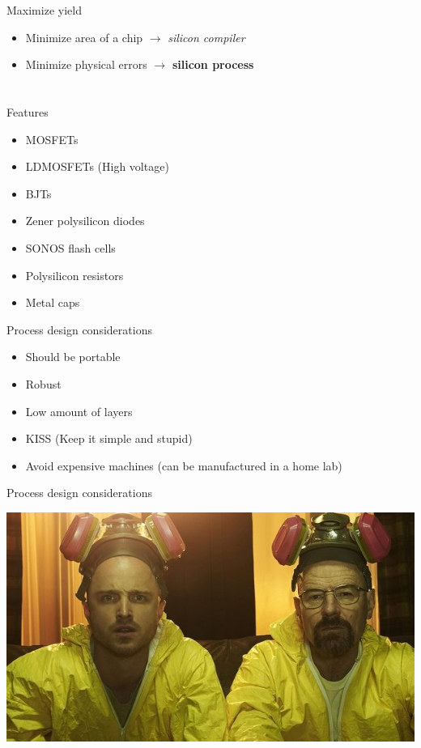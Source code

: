 \documentclass[aspectratio=169]{beamer}
\begin{document}
\begin{frame}{Maximize yield}
	\begin{itemize}
        \setlength\itemsep{1em}
		\item Minimize area of a chip $\rightarrow$ \textit{silicon compiler}
		\item Minimize physical errors $\rightarrow$ \textbf{silicon process}
	\end{itemize}
\end{frame}


\section[Process]{}

\begin{frame}{Features}
	\begin{itemize}
        \setlength\itemsep{1em}
		\item MOSFETs
		\item LDMOSFETs (High voltage) 
		\item BJTs
		\item Zener polysilicon diodes
		\item SONOS flash cells
		\item Polysilicon resistors
		\item Metal caps
	\end{itemize}
\end{frame}

\begin{frame}{Process design considerations}
	\begin{itemize}
		\item Should be portable
		\item Robust
		\item Low amount of layers
		\item KISS (Keep it simple and stupid)
		\item Avoid expensive machines (can be manufactured in a home lab)
	\end{itemize}
\end{frame}

\begin{frame}{Process design considerations}
\begin{center}
\includegraphics[height=0.8\textheight]{images/breaking-bad.jpg}
\end{center}
\end{frame}
\end{document}
